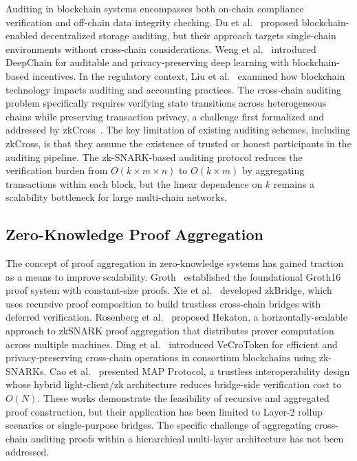\documentclass[journal]{IEEEtran}
\begin{document}
Auditing in blockchain systems encompasses both on-chain compliance verification and off-chain data integrity checking. Du et al.~\cite{du2021auditing} proposed blockchain-enabled decentralized storage auditing, but their approach targets single-chain environments without cross-chain considerations. Weng et al.~\cite{weng2019deepchain} introduced DeepChain for auditable and privacy-preserving deep learning with blockchain-based incentives. In the regulatory context, Liu et al.~\cite{liu2019auditing} examined how blockchain technology impacts auditing and accounting practices. The cross-chain auditing problem specifically requires verifying state transitions across heterogeneous chains while preserving transaction privacy, a challenge first formalized and addressed by zkCross~\cite{guo2024zkcross}. The key limitation of existing auditing schemes, including zkCross, is that they assume the existence of trusted or honest participants in the auditing pipeline. The zk-SNARK-based auditing protocol reduces the verification burden from $O(k \times m \times n)$ to $O(k \times m)$ by aggregating transactions within each block, but the linear dependence on $k$ remains a scalability bottleneck for large multi-chain networks.

\subsection{Zero-Knowledge Proof Aggregation}

The concept of proof aggregation in zero-knowledge systems has gained traction as a means to improve scalability. Groth~\cite{groth2016size} established the foundational Groth16 proof system with constant-size proofs. Xie et al.~\cite{xie2022zkbridge} developed zkBridge, which uses recursive proof composition to build trustless cross-chain bridges with deferred verification. Rosenberg et al.~\cite{rosenberg2024hekaton} proposed Hekaton, a horizontally-scalable approach to zkSNARK proof aggregation that distributes prover computation across multiple machines. Ding et al.~\cite{ding2025vecrotoken} introduced VeCroToken for efficient and privacy-preserving cross-chain operations in consortium blockchains using zk-SNARKs. Cao et al.~\cite{cao2025map} presented MAP Protocol, a trustless interoperability design whose hybrid light-client/zk architecture reduces bridge-side verification cost to $O(N)$. These works demonstrate the feasibility of recursive and aggregated proof construction, but their application has been limited to Layer-2 rollup scenarios or single-purpose bridges. The specific challenge of aggregating cross-chain auditing proofs within a hierarchical multi-layer architecture has not been addressed.
\end{document}
